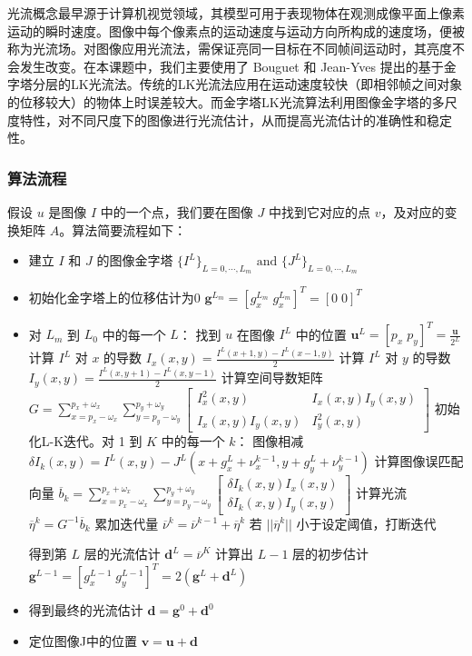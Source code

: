光流概念最早源于计算机视觉领域，其模型可用于表现物体在观测成像平面上像素运动的瞬时速度。图像中每个像素点的运动速度与运动方向所构成的速度场，便被称为光流场。对图像应用光流法，需保证亮同一目标在不同帧间运动时，其亮度不会发生改变。在本课题中，我们主要使用了 Bouguet 和 Jean-Yves 提出的基于金字塔分层的LK光流法\cite{bouguet2001pyramidal}。传统的LK光流法应用在运动速度较快（即相邻帧之间对象的位移较大）的物体上时误差较大。而金字塔LK光流算法利用图像金字塔的多尺度特性，对不同尺度下的图像进行光流估计，从而提高光流估计的准确性和稳定性。

\subsubsection{算法流程}

假设 $u$ 是图像 $I$ 中的一个点，我们要在图像 $J$ 中找到它对应的点 $v$，及对应的变换矩阵 $A$。算法简要流程如下：
\begin{itemize}
    \item 建立 $I$ 和 $J$ 的图像金字塔 \; $\{I^L\}_{L=0,\cdots,L_m} \text{ and } \{J^L\}_{L=0,\cdots,L_m}$
    \item 初始化金字塔上的位移估计为0 \; $\textbf{g}^{L_m}=[g_{x}^{L_m} \; g_{x}^{L_m}]^T=[0 \; 0]^T$
    \item 对 $L_m$ 到 $L_0$ 中的每一个 $L$：
    \subitem 找到 $u$ 在图像 $I^L$ 中的位置 \; $\textbf{u}^L=[p_x \; p_y]^T=\frac{\textbf{u}}{2^L}$
    \subitem 计算 $I^L$ 对 $x$ 的导数 \; $I_x(x,y)=\frac{I^L(x+1,y)-I^L(x-1,y)}{2}$
    \subitem 计算 $I^L$ 对 $y$ 的导数 \; $I_y(x,y)=\frac{I^L(x,y+1)-I^L(x,y-1)}{2}$
    \subitem 计算空间导数矩阵 \; $G=\sum_{x=p_x-\omega_x}^{p_x+\omega_x} \sum_{y=p_y-\omega_y}^{p_y+\omega_y} \begin{bmatrix} I_x^2(x,y) & I_x(x,y)I_y(x,y) \\ I_x(x,y)I_y(x,y) & I_y^2(x,y) \end{bmatrix} $
    \subitem 初始化L-K迭代。对 1 到 $K$ 中的每一个 $k$：
    \subsubitem 图像相减 \; $\delta I_k(x,y)=I^L(x,y)-J^L(x+g_x^L+\nu_x^{k-1},y+g_y^L+\nu_y^{k-1})$
    \subsubitem 计算图像误匹配向量 \; $\overline{b}_k=\sum_{x=p_x-\omega_x}^{p_x+\omega_x} \sum_{y=p_y-\omega_y}^{p_y+\omega_y} \begin{bmatrix} \delta I_k(x,y)I_x(x,y) \\ \delta I_k(x,y)I_y(x,y) \end{bmatrix} $
    \subsubitem 计算光流 \; $\overline{\eta}^k=G^{-1}\overline{b}_k$
    \subsubitem 累加迭代量 \; $\overline{\nu}^k = \overline{\nu}^{k-1} + \overline{\eta}^k$
    \subsubitem 若 $||\overline{\eta}^k||$ 小于设定阈值，打断迭代
    
    \subitem 得到第 $L$ 层的光流估计 \; $\textbf{d}^L = \overline{\nu}^K$
    \subitem 计算出 $L-1$ 层的初步估计 \; $\textbf{g}^{L-1}=[g_x^{L-1} \; g_y^{L-1}]^T=2(\textbf{g}^L+\textbf{d}^L)$
    \item 得到最终的光流估计 \; $\textbf{d}=\textbf{g}^0+\textbf{d}^0$
    \item 定位图像J中的位置 \; $\textbf{v}=\textbf{u}+\textbf{d}$
\end{itemize}

